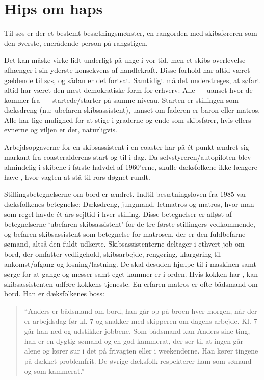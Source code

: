 \chapter{Hips om haps}\label{hips-om-haps}

Til søs er der et bestemt besætningsmønster, en rangorden med skibsføreren
som den øverste, enerådende person på rangstigen.

Det kan måske virke lidt underligt på unge i vor tid, men et skibs
overlevelse afhænger i sin yderste konsekvens af handlekraft. Disse
forhold har altid været gældende til søs, og sådan er det fortsat.
Samtidigt må det understreges, at søfart altid har været den mest
demokratiske form for erhverv: Alle --- uanset hvor de kommer fra ---
startede/starter på samme niveau. Starten er stillingen som dæksdreng (nu:
ubefaren skibsassistent), uanset om faderen er baron eller matros. Alle
har lige mulighed for at stige i graderne og ende som skibsfører, hvis
ellers evnerne og viljen er der, naturligvis. 

Arbejdsopgaverne for en skibsassistent i en coaster har på ét punkt ændret
sig markant fra coasteralderens start og til i dag. Da
selvstyreren/autopiloten blev almindelig i skibene i første halvdel af
1960'erne, skulle dæksfolkene ikke længere have , hvor vagten
 at stå til rors
døgnet rundt. 

Stillingsbetegnelserne om bord er ændret. Indtil besætningsloven fra 1985
var dæksfolkenes betegnelse: Dæksdreng, jungmand, letmatros og matros,
hvor man som regel havde ét års sejltid i hver stilling. Disse betegnelser
er afløst af betegnelserne `ubefaren skibsassistent' for de tre første
stillingers vedkommende, og befaren skibsassistent som betegnelse for
matrosen, der er den fuldbefarne sømand, altså den fuldt udlærte.
Skibsassistenterne deltager i ethvert job om bord, der omfatter
vedligehold, skibsarbejde, rengøring, klargøring til ankomst/afgang og
losning/lastning. De skal desuden hjælpe til i maskinen samt sørge for at
gange og messer samt eget kammer er i orden. Hvis kokken har
, kan skibsassistenten udføre kokkens tjeneste. En erfaren matros
er ofte bådsmand om bord. Han er dæksfolkenes boss: 

\begin{quote}
    ``Anders er bådsmand om bord, han går op på broen hver morgen, når der
    er arbejdsdag før kl. 7 og snakker med skipperen om dagens arbejde.
    Kl. 7 går han ned og udstikker jobbene. Som bådsmand kan Anders sine
    ting, han er en dygtig sømand og en god kammerat, der ser til at ingen
    går alene og kører sur i det på frivagten eller i weekenderne. Han
    kører tingene på dækket problemfrit. De øvrige dæksfolk respekterer
    ham som sømand og som kammerat.''
\end{quote}


